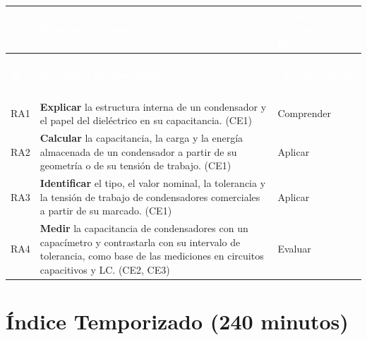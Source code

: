 \documentclass[11pt,letterpaper]{article}
\begin{document}
\begin{xltabular}{\linewidth}{>{\raggedright\arraybackslash}p{1.1cm}>{\raggedright\arraybackslash}X>{\raggedright\arraybackslash}p{3.9cm}}
 \textcolor{white}{\textbf{\#}} & \textcolor{white}{\textbf{Resultado de aprendizaje}} & \textcolor{white}{\textbf{Nivel (Taxonomía de Bloom)}} \\
\endfirsthead
{} \textcolor{white}{\textbf{\#}} & \textcolor{white}{\textbf{Resultado de aprendizaje}} & \textcolor{white}{\textbf{Nivel (Taxonomía de Bloom)}} \\
\endhead
\bottomrule
\endlastfoot
  RA1 & \textbf{Explicar} la estructura interna de un condensador y el papel del dieléctrico en su capacitancia. (CE1) & Comprender \\
   RA2 & \textbf{Calcular} la capacitancia, la carga y la energía almacenada de un condensador a partir de su geometría o de su tensión de trabajo. (CE1) & Aplicar \\
  RA3 & \textbf{Identificar} el tipo, el valor nominal, la tolerancia y la tensión de trabajo de condensadores comerciales a partir de su marcado. (CE1) & Aplicar \\
   RA4 & \textbf{Medir} la capacitancia de condensadores con un capacímetro y contrastarla con su intervalo de tolerancia, como base de las mediciones en circuitos capacitivos y LC. (CE2, CE3) & Evaluar \\
\end{xltabular}

\section{Índice Temporizado (240 minutos)}
\end{document}
